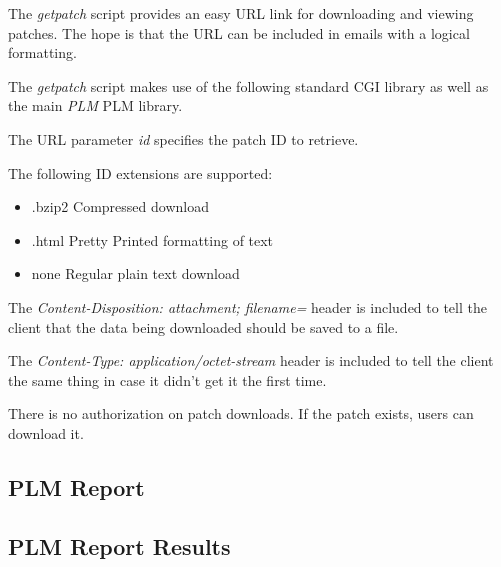 The \emph{getpatch} script provides an easy URL link for downloading and 
viewing patches.  The hope is that the URL can be included in emails with
a logical formatting.

The \emph{getpatch} script makes use of the following standard CGI library 
as well as the main \emph{PLM} PLM library.

The URL parameter \emph{id} specifies the patch ID to retrieve.

The following ID extensions are supported:
\begin{itemize}
\item{.bzip2} Compressed download
\item{.html}  Pretty Printed formatting of text
\item{none}   Regular plain text download
\end{itemize}

The \emph{Content-Disposition: attachment; filename=} header is included to
tell the client that the data being downloaded should be saved to a file.

The \emph{Content-Type: application/octet-stream} header is included to tell
the client the same thing in case it didn't get it the first time.

There is no authorization on patch downloads.  If the patch exists, users 
can download it.

\subsection{PLM Report}

\subsection{PLM Report Results}

